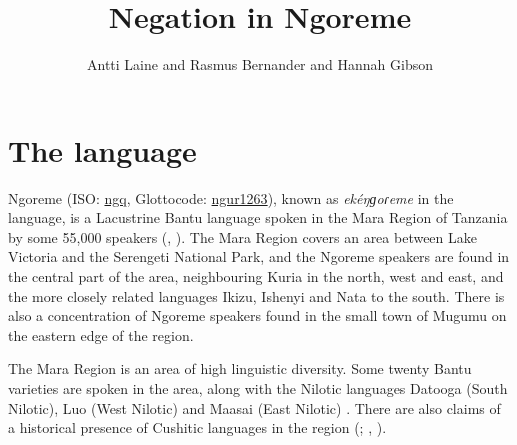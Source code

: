 \documentclass[output=paper,colorlinks,citecolor=brown,draftmode]{langscibook}
\author{Antti Laine\affiliation{Aix-Marseille University} and Rasmus Bernander\affiliation{University of Gothenburg} and Hannah Gibson\affiliation{University of Essex}}
\title{Negation in Ngoreme}
\begin{document}
\maketitle

\section{The language}\label{sec:ngo:1}

Ngoreme (ISO: \href{https://iso639-3.sil.org/code/ngq}{ngq}, Glottocode: \href{https://glottolog.org/resource/languoid/id/ngur1263}{ngur1263}), known as \textit{ekéŋɡoɾeme} in the language, is a Lacustrine Bantu language spoken in the Mara Region of Tanzania by some 55,000 speakers (\citealt{HillEtAl2007}, \citealt{LoT2009}). The Mara Region covers an area between Lake Victoria and the Serengeti National Park, and the Ngoreme speakers are found in the central part of the area, neighbouring Kuria in the north, west and east, and the more closely related languages Ikizu, Ishenyi and Nata to the south. There is also a concentration of Ngoreme speakers found in the small town of Mugumu on the eastern edge of the region.

The Mara Region is an area of high linguistic diversity. Some twenty Bantu varieties are spoken in the area, along with the Nilotic languages Datooga (South Nilotic), Luo (West Nilotic) and Maasai (East Nilotic) \citep{HillEtAl2007}. There are also claims of a historical presence of Cushitic languages in the region (\citealt{Ehret1971}; \citealt{Schoenbrun1994}, \citeyear{Schoenbrun1997}).
\end{document}
